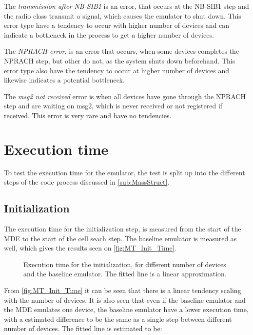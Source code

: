 The \textit{transmission after NB-SIB1} is an error, that occurs at the NB-SIB1 step and the radio class transmit a signal, which causes the emulator to shut down. This error type have a tendency to occur with higher number of devices and can indicate a bottleneck in the process to get a higher number of devices.

The \textit{NPRACH error}, is an error that occurs, when some devices completes the NPRACH step, but other do not, as the system shuts down beforehand. This error type also have the tendency to occur at higher number of devices and likewise indicates a potential bottleneck.

The \textit{msg2 not received} error is when all devices have gone through the NPRACH step and are waiting on msg2, which is never received or not registered if received. This error is very rare and have no tendencies.

\section{Execution time}
\label{sec:exeTime}
To test the execution time for the emulator, the test is split up into the different steps of the code process discussed in \autoref{sub:MassStruct}.

\subsection{Initialization}
The execution time for the initialization step, is measured from the start of the MDE to the start of the cell seach step. The baseline emulator is measured as well, which gives the results seen on \autoref{fig:MT_Init_Time}.


\begin{figure}[H]
\centering

\caption{Execution time for the initialization, for different number of devices and the baseline emulator. The fitted line is a linear approximation.}
\label{fig:MT_Init_Time}
\end{figure}

From \autoref{fig:MT_Init_Time} it can be seen that there is a linear tendency scaling with the number of devices. It is also seen that even if the baseline emulator and the MDE emulates one device, the baseline emulator have a lower execution time, with a estimated difference to be the same as a single step between different number of devices. The fitted line is estimated to be:


